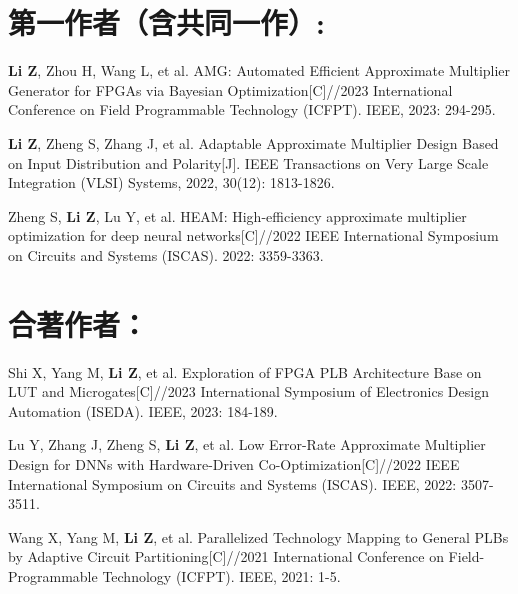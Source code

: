 \section*{第一作者（含共同一作）:}
\begin{enumerate}[label={[\arabic*]}]
  \item \textbf{Li Z}, Zhou H, Wang L, et al. AMG: Automated Efficient Approximate Multiplier Generator for FPGAs via Bayesian Optimization[C]//2023 International Conference on Field Programmable Technology (ICFPT). IEEE, 2023: 294-295.
  \item \textbf{Li Z}, Zheng S, Zhang J, et al. Adaptable Approximate Multiplier Design Based on Input Distribution and Polarity[J]. IEEE Transactions on Very Large Scale Integration (VLSI) Systems, 2022, 30(12): 1813-1826.
  \item Zheng S, \textbf{Li Z}, Lu Y, et al. HEAM: High-efficiency approximate multiplier optimization for deep neural networks[C]//2022 IEEE International Symposium on Circuits and Systems (ISCAS). 2022: 3359-3363.
\end{enumerate}

\vspace{5pt}
\section*{合著作者：}
\begin{enumerate}[label={[\arabic*]}]
  \item Shi X, Yang M, \textbf{Li Z}, et al. Exploration of FPGA PLB Architecture Base on LUT and Microgates[C]//2023 International Symposium of Electronics Design Automation (ISEDA). IEEE, 2023: 184-189.
  \item Lu Y, Zhang J, Zheng S, \textbf{Li Z}, et al. Low Error-Rate Approximate Multiplier Design for DNNs with Hardware-Driven Co-Optimization[C]//2022 IEEE International Symposium on Circuits and Systems (ISCAS). IEEE, 2022: 3507-3511.
  \item Wang X, Yang M, \textbf{Li Z}, et al. Parallelized Technology Mapping to General PLBs by Adaptive Circuit Partitioning[C]//2021 International Conference on Field-Programmable Technology (ICFPT). IEEE, 2021: 1-5.
\end{enumerate}

\fi